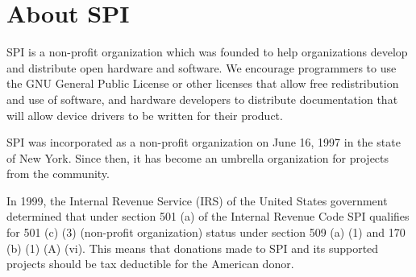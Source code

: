 \documentclass[letterpaper]{report}
\begin{document}
\appendix
\chapter{About SPI}

SPI is a non-profit organization which was founded to help organizations
develop and distribute open hardware and software. We encourage programmers
to use the GNU General Public License or other licenses that allow free
redistribution and use of software, and hardware developers to distribute
documentation that will allow device drivers to be written for their product.

SPI was incorporated as a non-profit organization on June 16, 1997 in the state
of New York. Since then, it has become an umbrella organization for projects
from the community.

In 1999, the Internal Revenue Service (IRS) of the United States government
determined that under section 501 (a) of the Internal Revenue Code SPI
qualifies for 501 (c) (3) (non-profit organization) status under section 509
(a) (1) and 170 (b) (1) (A) (vi). This means that donations made to SPI and its
supported projects should be tax deductible for the American donor.
\end{document}

